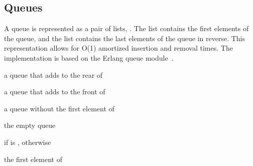 \subsection {Queues}

A queue is represented as a pair of lists,
. The  list contains the first
elements of the queue, and the  list contains the last
elements of the queue in reverse. This representation allows for O(1)
amortized insertion and removal times. The implementation is based on
the Erlang queue module~\cite{queue-ref}.

\begin{procedure}
\end{procedure}
\returns{} a queue that adds  to the rear of 

\begin{procedure}
\end{procedure}
\returns{} a queue that adds  to the front of 

\begin{procedure}
\end{procedure}
\returns{} a queue without the first element of 

\begin{syntax}
\end{syntax}
\returns{} the empty queue

\begin{procedure}
\end{procedure}
\returns{}  if  is ,  otherwise

\begin{procedure}
\end{procedure}
\returns{} the first element of 

